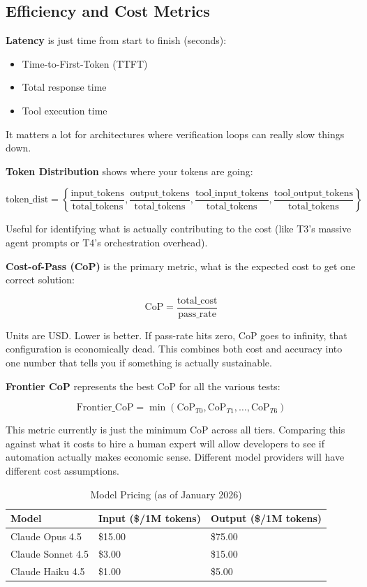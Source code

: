 \documentclass[11pt]{article}
\begin{document}
\subsection{Efficiency and Cost Metrics}

\textbf{Latency} is just time from start to finish (seconds):

\begin{itemize}
\item Time-to-First-Token (TTFT)
\item Total response time
\item Tool execution time

\end{itemize}

It matters a lot for architectures where verification loops can really slow
things down.

\textbf{Token Distribution} shows where your tokens are going:

$$\text{token\_dist} = \left\{ \frac{\text{input\_tokens}}{\text{total\_tokens}}, \frac{\text{output\_tokens}}{\text{total\_tokens}}, \frac{\text{tool\_input\_tokens}}{\text{total\_tokens}}, \frac{\text{tool\_output\_tokens}}{\text{total\_tokens}} \right\}$$

Useful for identifying what is actually contributing to the cost (like T3's
massive agent prompts or T4's orchestration overhead).

\textbf{Cost-of-Pass (CoP)} is the primary metric, what is the expected cost to get
one correct solution:

$$\text{CoP} = \frac{\text{total\_cost}}{\text{pass\_rate}}$$

Units are USD. Lower is better. If pass-rate hits zero, CoP goes to infinity,
that configuration is economically dead. This combines both cost and accuracy
into one number that tells you if something is actually sustainable.

\textbf{Frontier CoP} represents the best CoP for all the various tests:

$$\text{Frontier\_CoP} = \min(\text{CoP}_{T0}, \text{CoP}_{T1}, \ldots, \text{CoP}_{T6})$$

This metric currently is just the minimum CoP across all tiers. Comparing this
against what it costs to hire a human expert will allow developers to see if
automation actually makes economic sense. Different model providers will have
different cost assumptions.

\begin{table}[htbp]
\centering
\caption{Model Pricing (as of January 2026)}
\begin{tabular}{lll}
\toprule
Model & Input (\$/1M tokens) & Output (\$/1M tokens) \\
\midrule
Claude Opus 4.5 & \$15.00 & \$75.00 \\
Claude Sonnet 4.5 & \$3.00 & \$15.00 \\
Claude Haiku 4.5 & \$1.00 & \$5.00 \\
\bottomrule
\end{tabular}
\end{table}
\end{document}
